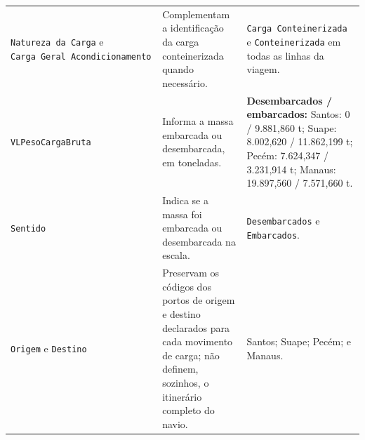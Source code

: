 \documentclass[brazil,]{article}
\begin{document}
\begin{longtable}[]{@{}lll@{}}
\begin{minipage}[t]{0.30\columnwidth}
\texttt{Natureza\ da\ Carga} e
\texttt{Carga\ Geral\ Acondicionamento}\strut
\end{minipage} & \begin{minipage}[t]{0.30\columnwidth}\raggedright
Complementam a identificação da carga conteinerizada quando
necessário.\strut
\end{minipage} & \begin{minipage}[t]{0.30\columnwidth}\raggedright
\texttt{Carga\ Conteinerizada} e \texttt{Conteinerizada} em todas as
linhas da viagem.\strut
\end{minipage}\tabularnewline
\begin{minipage}[t]{0.30\columnwidth}\raggedright
\texttt{VLPesoCargaBruta}\strut
\end{minipage} & \begin{minipage}[t]{0.30\columnwidth}\raggedright
Informa a massa embarcada ou desembarcada, em toneladas.\strut
\end{minipage} & \begin{minipage}[t]{0.30\columnwidth}\raggedright
\textbf{Desembarcados / embarcados:}\newline
Santos: 0 / 9.881,860 t;\newline
Suape: 8.002,620 / 11.862,199 t;\newline
Pecém: 7.624,347 / 3.231,914 t;\newline
Manaus: 19.897,560 / 7.571,660 t.\strut
\end{minipage}\tabularnewline
\begin{minipage}[t]{0.30\columnwidth}\raggedright
\texttt{Sentido}\strut
\end{minipage} & \begin{minipage}[t]{0.30\columnwidth}\raggedright
Indica se a massa foi embarcada ou desembarcada na escala.\strut
\end{minipage} & \begin{minipage}[t]{0.30\columnwidth}\raggedright
\texttt{Desembarcados} e \texttt{Embarcados}.\strut
\end{minipage}\tabularnewline
\begin{minipage}[t]{0.30\columnwidth}\raggedright
\texttt{Origem} e \texttt{Destino}\strut
\end{minipage} & \begin{minipage}[t]{0.30\columnwidth}\raggedright
Preservam os códigos dos portos de origem e destino declarados para cada
movimento de carga; não definem, sozinhos, o itinerário completo do
navio.\strut
\end{minipage} & \begin{minipage}[t]{0.30\columnwidth}\raggedright
Santos; Suape; Pecém; e Manaus.\strut
\end{minipage}\tabularnewline
\bottomrule
\end{longtable}
\end{document}
